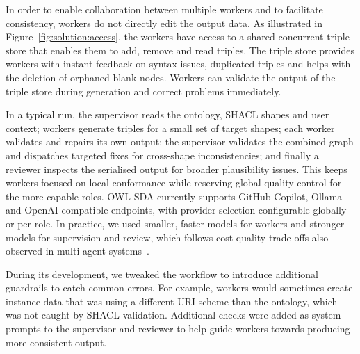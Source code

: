 In order to enable collaboration between multiple workers and to facilitate consistency, workers do not directly edit the output data. As illustrated in Figure~\ref{fig:solution:access}, the workers have access to a shared concurrent triple store that enables them to add, remove and read triples. The triple store provides workers with instant feedback on syntax issues, duplicated triples and helps with the deletion of orphaned blank nodes. Workers can validate the output of the triple store during generation and correct problems immediately.

In a typical run, the supervisor reads the ontology, SHACL shapes and user context; workers generate triples for a small set of target shapes; each worker validates and repairs its own output; the supervisor validates the combined graph and dispatches targeted fixes for cross-shape inconsistencies; and finally a reviewer inspects the serialised output for broader plausibility issues. This keeps workers focused on local conformance while reserving global quality control for the more capable roles. OWL-SDA currently supports GitHub Copilot, Ollama and OpenAI-compatible endpoints, with provider selection configurable globally or per role. In practice, we used smaller, faster models for workers and stronger models for supervision and review, which follows cost-quality trade-offs also observed in multi-agent systems~\cite{chen2023less}.

During its development, we tweaked the workflow to introduce additional guardrails to catch common errors. For example, workers would sometimes create instance data that was using a different URI scheme than the ontology, which was not caught by SHACL validation. Additional checks were added as system prompts to the supervisor and reviewer to help guide workers towards producing more consistent output.